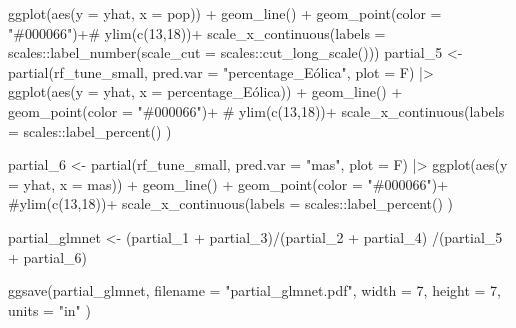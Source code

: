 \documentclass[
]{report}
\newenvironment{Shaded}{\begin{snugshade}}{\end{snugshade}}
\newcommand{\AttributeTok}[1]{\textcolor[rgb]{0.40,0.45,0.13}{#1}}
\newcommand{\CommentTok}[1]{\textcolor[rgb]{0.37,0.37,0.37}{#1}}
\newcommand{\DecValTok}[1]{\textcolor[rgb]{0.68,0.00,0.00}{#1}}
\newcommand{\FunctionTok}[1]{\textcolor[rgb]{0.28,0.35,0.67}{#1}}
\newcommand{\NormalTok}[1]{\textcolor[rgb]{0.00,0.23,0.31}{#1}}
\newcommand{\OtherTok}[1]{\textcolor[rgb]{0.00,0.23,0.31}{#1}}
\newcommand{\SpecialCharTok}[1]{\textcolor[rgb]{0.37,0.37,0.37}{#1}}
\newcommand{\StringTok}[1]{\textcolor[rgb]{0.13,0.47,0.30}{#1}}
\begin{document}
\begin{Shaded}
\begin{Highlighting}[]
  \FunctionTok{ggplot}\NormalTok{(}\FunctionTok{aes}\NormalTok{(}\AttributeTok{y =}\NormalTok{ yhat, }\AttributeTok{x =}\NormalTok{ pop)) }\SpecialCharTok{+} \FunctionTok{geom\_line}\NormalTok{() }\SpecialCharTok{+}
  \FunctionTok{geom\_point}\NormalTok{(}\AttributeTok{color =} \StringTok{"\#000066"}\NormalTok{)}\SpecialCharTok{+}\CommentTok{\# ylim(c(13,18))+}
  \FunctionTok{scale\_x\_continuous}\NormalTok{(}\AttributeTok{labels =}\NormalTok{ scales}\SpecialCharTok{::}\FunctionTok{label\_number}\NormalTok{(}\AttributeTok{scale\_cut =}\NormalTok{ scales}\SpecialCharTok{::}\FunctionTok{cut\_long\_scale}\NormalTok{())) }
\NormalTok{partial\_5 }\OtherTok{\textless{}{-}} \FunctionTok{partial}\NormalTok{(rf\_tune\_small, }\AttributeTok{pred.var =} \StringTok{"percentage\_Eólica"}\NormalTok{, }\AttributeTok{plot =}\NormalTok{ F) }\SpecialCharTok{|\textgreater{}} 
  \FunctionTok{ggplot}\NormalTok{(}\FunctionTok{aes}\NormalTok{(}\AttributeTok{y =}\NormalTok{ yhat, }\AttributeTok{x =}\NormalTok{ percentage\_Eólica)) }\SpecialCharTok{+} \FunctionTok{geom\_line}\NormalTok{() }\SpecialCharTok{+}
  \FunctionTok{geom\_point}\NormalTok{(}\AttributeTok{color =} \StringTok{"\#000066"}\NormalTok{)}\SpecialCharTok{+} \CommentTok{\# ylim(c(13,18))+}
  \FunctionTok{scale\_x\_continuous}\NormalTok{(}\AttributeTok{labels =}\NormalTok{ scales}\SpecialCharTok{::}\FunctionTok{label\_percent}\NormalTok{() )}

\NormalTok{partial\_6 }\OtherTok{\textless{}{-}} \FunctionTok{partial}\NormalTok{(rf\_tune\_small, }\AttributeTok{pred.var =} \StringTok{"mas"}\NormalTok{, }\AttributeTok{plot =}\NormalTok{ F) }\SpecialCharTok{|\textgreater{}} 
  \FunctionTok{ggplot}\NormalTok{(}\FunctionTok{aes}\NormalTok{(}\AttributeTok{y =}\NormalTok{ yhat, }\AttributeTok{x =}\NormalTok{ mas)) }\SpecialCharTok{+} \FunctionTok{geom\_line}\NormalTok{() }\SpecialCharTok{+}
  \FunctionTok{geom\_point}\NormalTok{(}\AttributeTok{color =} \StringTok{"\#000066"}\NormalTok{)}\SpecialCharTok{+} \CommentTok{\#ylim(c(13,18))+}
  \FunctionTok{scale\_x\_continuous}\NormalTok{(}\AttributeTok{labels =}\NormalTok{ scales}\SpecialCharTok{::}\FunctionTok{label\_percent}\NormalTok{() ) }

\NormalTok{partial\_glmnet }\OtherTok{\textless{}{-}}\NormalTok{ (partial\_1 }\SpecialCharTok{+}\NormalTok{ partial\_3)}\SpecialCharTok{/}\NormalTok{(partial\_2 }\SpecialCharTok{+}\NormalTok{ partial\_4) }\SpecialCharTok{/}\NormalTok{(partial\_5 }\SpecialCharTok{+}\NormalTok{ partial\_6)}

\FunctionTok{ggsave}\NormalTok{(partial\_glmnet, }\AttributeTok{filename =} \StringTok{"partial\_glmnet.pdf"}\NormalTok{, }\AttributeTok{width =} \DecValTok{7}\NormalTok{, }\AttributeTok{height =} \DecValTok{7}\NormalTok{, }\AttributeTok{units =} \StringTok{"in"}\NormalTok{ )}
\end{Highlighting}
\end{Shaded}
\end{document}
